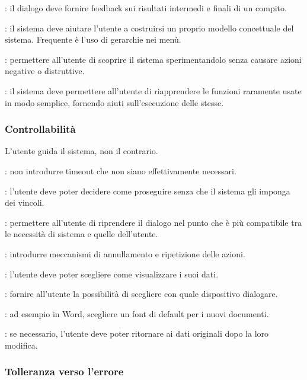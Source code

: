 : il dialogo deve fornire feedback sui risultati intermedi e finali di un compito.

: il sistema deve aiutare l'utente a costruirsi un proprio modello concettuale del sistema. Frequente è l'uso di gerarchie nei menù.

: permettere all'utente di scoprire il sistema sperimentandolo senza causare azioni negative o distruttive.

: il sistema deve permettere all'utente di riapprendere le funzioni raramente usate in modo semplice, fornendo aiuti sull'esecuzione delle stesse.

\subsubsection{Controllabilità}

L'utente guida il sistema, non il contrario.

: non introdurre timeout che non siano effettivamente necessari.

: l'utente deve poter decidere come proseguire senza che il sistema gli imponga dei vincoli.

: permettere all'utente di riprendere il dialogo nel punto che è più compatibile tra le necessità di sistema e quelle dell'utente.

: introdurre meccanismi di annullamento e ripetizione delle azioni.

: l'utente deve poter scegliere come visualizzare i suoi dati.

: fornire all'utente la possibilità di scegliere con quale dispositivo dialogare.

: ad esempio in Word, scegliere un font di default per i nuovi documenti.

: se necessario, l'utente deve poter ritornare ai dati originali dopo la loro modifica.

\subsubsection{Tolleranza verso l’errore}

